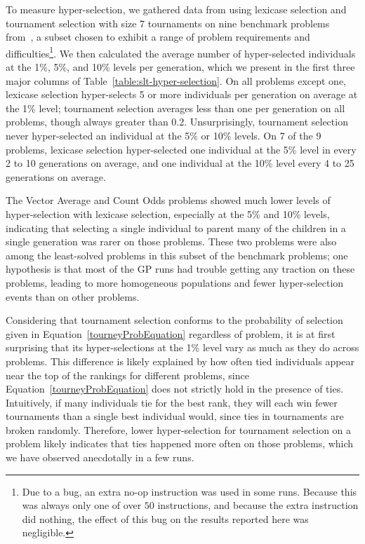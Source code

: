 \documentclass{sig-alternate}
\begin{document}
To measure hyper-selection, we gathered data from using lexicase selection and tournament selection with size 7 tournaments on nine benchmark problems from~\cite{Helmuth:2015:GECCO, Helmuth:2015:dissertation}, a subset chosen to exhibit a range of problem requirements and difficulties\footnote{\label{footnote:autoconstructive-rand-integer-bug}Due to a bug, an extra no-op instruction was used in some runs. Because this was always only one of over $50$ instructions, and because the extra instruction did nothing, the effect of this bug on the results reported here was negligible.}.
We then calculated the average number of hyper-selected individuals at the 1\%, 5\%, and 10\% levels per generation, which we present in the first three major columns of Table~\ref{table:slt-hyper-selection}. On all problems except one, lexicase selection hyper-selects 5 or more individuals per generation on average at the 1\% level; tournament selection averages less than one per generation on all problems, though always greater than 0.2. Unsurprisingly, tournament selection never hyper-selected an individual at the 5\% or 10\% levels.
On 7 of the 9 problems, lexicase selection hyper-selected one individual at the 5\% level in every 2 to 10 generations on average, and one individual at the 10\% level every 4 to 25 generations on average. 

The Vector Average and Count Odds problems showed much lower levels of hyper-selection with lexicase selection, especially at the 5\% and 10\% levels, indicating that selecting a single individual to parent many of the children in a single generation was rarer on those problems. These two problems were also among the least-solved problems in this subset of the benchmark problems; one hypothesis is that most of the GP runs had trouble getting any traction on these problems, leading to more homogeneous populations and fewer hyper-selection events than on other problems.


Considering that tournament selection conforms to the probability of selection given in Equation~\ref{tourneyProbEquation} regardless of problem, it is at first surprising that its hyper-selections at the 1\% level vary as much as they do across problems. This difference is likely explained by how often tied individuals appear near the top of the rankings for different problems, since Equation~\ref{tourneyProbEquation} does not strictly hold in the presence of ties. Intuitively, if many individuals tie for the best rank, they will each win fewer tournaments than a single best individual would, since ties in tournaments are broken randomly. Therefore, lower hyper-selection for tournament selection on a problem likely indicates that ties happened more often on those problems, which we have observed anecdotally in a few runs.
\end{document}
